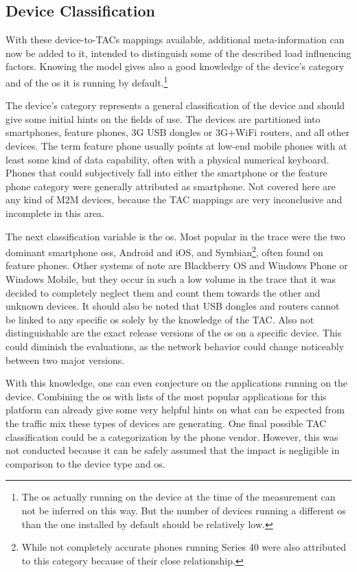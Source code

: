 \subsection{Device Classification}

With these device-to-\glspl{TAC} mappings available, additional meta-information can now be added to it, intended to distinguish some of the described load influencing factors. Knowing the model gives also a good knowledge of the device's category and of the \gls{os} it is running by default.\footnote{The \gls{os} actually running on the device at the time of the measurement can not be inferred on this way. But the number of devices running a different \gls{os} than the one installed by default should be relatively low.}

The device's category represents a general classification of the device and should give some initial hints on the fields of use. The devices are partitioned into smartphones, feature phones, \gls{3G} USB dongles or \gls{3G}+WiFi routers, and all other devices. The term feature phone usually points at low-end mobile phones with at least some kind of data capability, often with a physical numerical keyboard. Phones that could subjectively fall into either the smartphone or the feature phone category were generally attributed as smartphone. Not covered here are any kind of \gls{M2M} devices, because the \gls{TAC} mappings are very inconclusive and incomplete in this area.

The next classification variable is the \gls{os}. Most popular in the trace were the two dominant smartphone \glspl{os}, Android and iOS, and Symbian\footnote{While not completely accurate phones running Series 40 were also attributed to this category because of their close relationship.}, often found on feature phones. Other systems of note are Blackberry OS and Windows Phone or Windows Mobile, but they occur in such a low volume in the trace that it was decided to completely neglect them and count them towards the other and unknown devices. It should also be noted that USB dongles and routers cannot be linked to any specific \gls{os} solely by the knowledge of the \gls{TAC}. Also not distinguishable are the exact release versions of the \gls{os} on a specific device. This could diminish the evaluations, as the network behavior could change noticeably between two major versions.

With this knowledge, one can even conjecture on the applications running on the device. Combining the \gls{os} with lists of the most popular applications for this platform can already give some very helpful hints on what can be expected from the traffic mix these types of devices are generating. One final possible \gls{TAC} classification could be a categorization by the phone vendor. However, this was not conducted because it can be safely assumed that the impact is negligible in comparison to the device type and \gls{os}.


